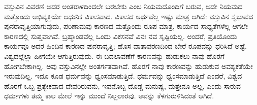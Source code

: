 \newpage

ವಸ್ತುವಿನ ವಿವರಣೆ ಅದರ ಅಂತರಾಳದಿಂದಲೇ ಬರಬೇಕು ಎಂಬ ನಿಯಮದೊಂದಿಗೆ ಬರುವ, ಅದೇ ನಿಯಮದ ಮತ್ತೊಂದು ಅಭಿವ್ಯಕ್ತಿಯೇ ಆಧುನಿಕ ವಿಕಾಸವಾದ. ವಿಕಾಸದ ಅರ್ಥವೆಲ್ಲ ಇಷ್ಟು ಮಾತ್ರ ಆಗಿದೆ: ವಸ್ತುವಿನ ಸ್ವಭಾವದ ಪುನರಾವೃತ್ತಿಯಾಗುವುದು, ಪರಿಣಾಮವು ಕಾರಣದ ಮತ್ತೊಂದು ರೂಪ ಮಾತ್ರ, ಕಾರ್ಯದ ಸಾಧ್ಯತೆಗಳೆಲ್ಲ ಆಗಲೇ ಕಾರಣದಲ್ಲಿ ಸುಪ್ತವಾಗಿವೆ. ಬ್ರಹ್ಮಾಂಡವೆಲ್ಲ ಒಂದು ವಿಕಸನವೆ ವಿನಃ ನವ ಸೃಷ್ಟಿಯಲ್ಲ. ಅಂದರೆ, ಪ್ರತಿಯೊಂದು ಕಾರ್ಯವೂ ಅದರ ಹಿಂದಿನ ಕಾರಣದ ಪುನರಾವೃತ್ತಿ; ಹೊಸ ವಾತಾವರಣದಿಂದ ಬೇರೆ ರೂಪವನ್ನು ಧರಿಸಿದೆ ಅಷ್ಟೆ. ವಿಶ್ವದಲ್ಲೆಲ್ಲಾ ಹೀಗೆಯೇ ಆಗುತ್ತಿರುವುದು. ಈ ಬದಲಾವಣೆಗೆ ಕಾರಣವನ್ನು ಹುಡುಕಲು ನಾವು ಹೊರಗೆ ಹೋಗಬೇಕಾಗಿಲ್ಲ. ಅವು ವಸ್ತುವಿನಲ್ಲೇ ಅಂತರ್ಗತವಾಗಿವೆ. ಹೊರಗೆ ನಾವು ಕಾರಣವನ್ನು ಹುಡುಕುವ ಅವಶ್ಯಕತೆಯೇ ಇರುವುದಿಲ್ಲ. ಇದೂ ಕೂಡ ಧರ್ಮವನ್ನು ಧ್ವಂಸಮಾಡುತ್ತಿದೆ. ಧರ್ಮವನ್ನು ಧ್ವಂಸಮಾಡುತ್ತಿದೆ ಎಂದರೆ, ವಿಶ್ವದ ಹೊರಗೆ ಒಬ್ಬ ಪ್ರತ್ಯೇಕವಾದ ದೇವರಿರುವನು, ಇವನೊಬ್ಬ ದೊಡ್ಡ ಮನುಷ್ಯ, ಮತ್ತೇನೂ ಅಲ್ಲ, ಎಂದು ಸಾರುವ ಧರ್ಮಗಳು ತಮ್ಮ ಕಾಲ ಮೇಲೆ ಇನ್ನು ಮುಂದೆ ನಿಲ್ಲಲಾರವು. ಅವನ್ನು ಕೆಳಗುರುಳಿಸಿದಂತೆ ಆಗಿದೆ.

